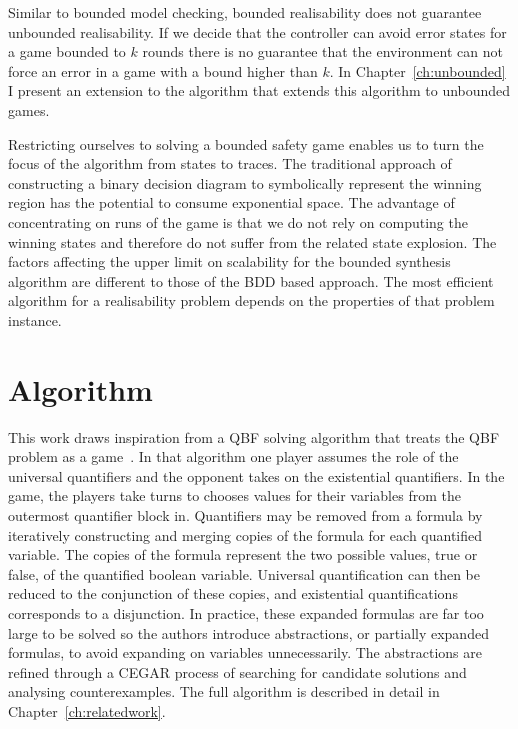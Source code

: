 Similar to bounded model checking, bounded realisability does not guarantee unbounded realisability.  If we decide that the controller can avoid error states for a game bounded to $k$ rounds there is no guarantee that the environment can not force an error in a game with a bound higher than $k$. In Chapter~\ref{ch:unbounded} I present an extension to the algorithm that extends this algorithm to unbounded games.

Restricting ourselves to solving a bounded safety game enables us to turn the focus of the algorithm from states to traces. The traditional approach of constructing a binary decision diagram to symbolically represent the winning region has the potential to consume exponential space. The advantage of concentrating on runs of the game is that we do not rely on computing the winning states and therefore do not suffer from the related state explosion. The factors affecting the upper limit on scalability for the bounded synthesis algorithm are different to those of the BDD based approach. The most efficient algorithm for a realisability problem depends on the properties of that problem instance.

\section{Algorithm}

This work draws inspiration from a QBF solving algorithm that treats the QBF problem as a game~\cite{Janota12}. In that algorithm one player assumes the role of the universal quantifiers and the opponent takes on the existential quantifiers. In the game, the players take turns to chooses values for their variables from the outermost quantifier block in. Quantifiers may be removed from a formula by iteratively constructing and merging copies of the formula for each quantified variable. The copies of the formula represent the two possible values, true or false, of the quantified boolean variable. Universal quantification can then be reduced to the conjunction of these copies, and existential quantifications corresponds to a disjunction. In practice, these expanded formulas are far too large to be solved so the authors introduce abstractions, or partially expanded formulas, to avoid expanding on variables unnecessarily. The abstractions are refined through a CEGAR process of searching for candidate solutions and analysing counterexamples. The full algorithm is described in detail in Chapter~\ref{ch:relatedwork}. 

